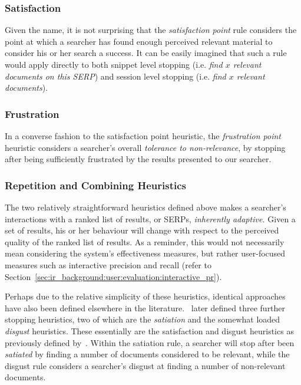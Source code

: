 \subsubsection{Satisfaction}
Given the name, it is not surprising that the \emph{satisfaction point} rule considers the point at which a searcher has found enough perceived relevant material to consider his or her search a success. It can be easily imagined that such a rule would apply directly to both snippet level stopping (i.e. \emph{find $x$ relevant documents on this SERP}) and session level stopping (i.e. \emph{find $x$ relevant documents}).

\subsubsection{Frustration}
In a converse fashion to the satisfaction point heuristic, the \emph{frustration point} heuristic considers a searcher's overall \emph{tolerance to non-relevance}, by stopping after being sufficiently frustrated by the results presented to our searcher.

\subsubsection{Repetition and Combining Heuristics}
The two relatively straightforward heuristics defined above makes a searcher's interactions with a ranked list of results, or SERPs, \emph{inherently adaptive.} Given a set of results, his or her behaviour will change with respect to the perceived quality of the ranked list of results. As a reminder, this would not necessarily mean considering the system's effectiveness measures, but rather user-focused measures such as interactive precision and recall (refer to Section~\ref{sec:ir_background:user:evaluation:interactive_pr}).

Perhaps due to the relative simplicity of these heuristics, identical approaches have also been defined elsewhere in the literature.~\cite{kraft1979stopping_rules} later defined three further stopping heuristics, two of which are the \emph{satiation} and the somewhat loaded \emph{disgust} heuristics. These essentially are the satisfaction and disgust heuristics as previously defined by~\cite{cooper1973retrieval_effectiveness_ii}. Within the satiation rule, a searcher will stop after been \emph{satiated} by finding a number of documents considered to be relevant, while the disgust rule considers a searcher's disgust at finding a number of non-relevant documents.

